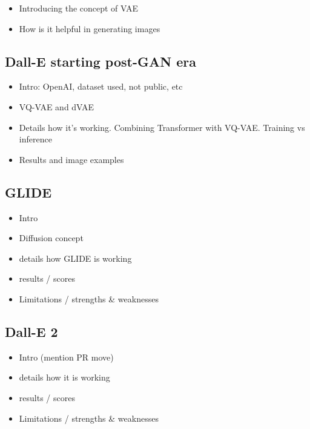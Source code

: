 \documentclass[
]{krantz}
\providecommand{\tightlist}{%
  \setlength{\itemsep}{0pt}\setlength{\parskip}{0pt}}
\begin{document}
\begin{itemize}
\tightlist
\item
  Introducing the concept of VAE
\item
  How is it helpful in generating images
\end{itemize}

\hypertarget{dall-e-starting-post-gan-era}{%
\subsection{Dall-E starting post-GAN era}\label{dall-e-starting-post-gan-era}}

\begin{itemize}
\tightlist
\item
  Intro: OpenAI, dataset used, not public, etc
\item
  VQ-VAE and dVAE
\item
  Details how it's working. Combining Transformer with VQ-VAE. Training vs inference
\item
  Results and image examples
\end{itemize}

\hypertarget{glide}{%
\subsection{GLIDE}\label{glide}}

\begin{itemize}
\tightlist
\item
  Intro
\item
  Diffusion concept
\item
  details how GLIDE is working
\item
  results / scores
\item
  Limitations / strengths \& weaknesses
\end{itemize}

\hypertarget{dall-e-2}{%
\subsection{Dall-E 2}\label{dall-e-2}}

\begin{itemize}
\tightlist
\item
  Intro (mention PR move)
\item
  details how it is working
\item
  results / scores
\item
  Limitations / strengths \& weaknesses
\end{itemize}
\end{document}

